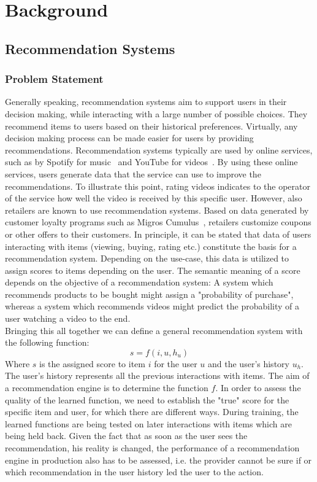 \chapter{Background}

\section{Recommendation Systems}
\subsection{Problem Statement}
Generally speaking, recommendation systems aim to support users in their decision making, while interacting with a large number of possible choices.
They recommend items to users based on their historical preferences.
Virtually, any decision making process can be made easier for users by providing recommendations.
Recommendation systems typically are used by online services, such as by Spotify for music~\cite{rec_spotify} and YouTube for videos~\cite{rec_yt}.
By using these online services, users generate data that the service can use to improve the recommendations.
To illustrate this point, rating videos indicates to the operator of the service how well the video is received by this specific user.
However, also retailers are known to use recommendation systems.
Based on data generated by customer loyalty programs such as Migros Cumulus~\cite{rec_migros}, retailers customize coupons or other offers to their customers.
In principle, it can be stated that data of users interacting with items (viewing, buying, rating etc.) constitute the basis for a recommendation system. 
Depending on the use-case, this data is utilized to assign scores to items depending on the user. 
The semantic meaning of a score depends on the objective of a recommendation system:
A system which recommends products to be bought might assign a "probability of purchase", whereas a system which recommends videos might predict the probability of a user watching a video to the end. 
\\
Bringing this all together we can define a general recommendation system with the following function:
\begin{equation}\label{eq:recommendation_system}
    s = f(i, u, h_u)
\end{equation}
Where $s$ is the assigned score to item $i$ for the user $u$ and the user's history $u_h$. 
The user's history represents all the previous interactions with items.
The aim of a recommendation engine is to determine the function $f$.
In order to assess the quality of the learned function, we need to establish the "true" score for the specific item and user, for which there are different ways.
During training, the learned functions are being tested on later interactions with items which are being held back.
Given the fact that as soon as the user sees the recommendation, his reality is changed, the performance of a recommendation engine in production also has to be assessed, i.e. the provider cannot be sure if or which recommendation in the user history led the user to the action.
